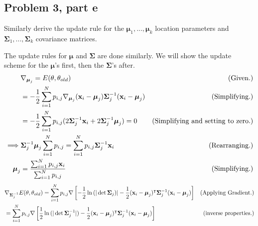 \subsection{Problem 3, part e}
Similarly derive the update rule for the $\boldsymbol{\mu}_1, ..., \boldsymbol{\mu}_k$ location parameters and $\boldsymbol{\Sigma}_1, ..., \boldsymbol{\Sigma}_k$ covariance matrices. 
\vspace{-2mm}\partbreak\vspace{-2mm}
\begin{solution}

    The update rules for $\boldsymbol{\mu}$ and $\boldsymbol{\Sigma}$ are done similarly. We will show the update scheme for the $\boldsymbol{\mu}$'s first, then the $\boldsymbol{\Sigma}$'s after. 
    \tightalignbreak\vspace{-2mm}
    \begin{align*}
        &\nabla_{\boldsymbol{\mu}_j} = E(\theta, \theta_{old}) &\text{(Given.)}\\
        &= -\frac{1}{2}\sum_{i = 1}^N p_{i, j} \nabla_{\boldsymbol{\mu}_j}(\textbf{x}_i - \boldsymbol{\mu}_j) \boldsymbol{\Sigma}^{-1}_j (\textbf{x}_i - \boldsymbol{\mu}_j) &\text{(Simplifying.)}\\
        &= -\frac{1}{2}\sum_{i = 1}^N p_{i, j} (2\boldsymbol{\Sigma}^{-1}_j \textbf{x}_i + 2\boldsymbol{\Sigma}^{-1}_j \boldsymbol{\mu}_j) = 0 &\text{(Simplifying and setting to zero.)}\\
        \implies & \boldsymbol{\Sigma}^{-1}_j\boldsymbol{\mu}_j\sum_{i = 1}^Np_{i, j} = \sum_{i = 1}^N p_{i, j}\boldsymbol{\Sigma}^{-1}_j \textbf{x}_i &\text{(Rearranging.)}\\
        \boldsymbol{\mu}_j &= \frac{\sum_{i = 1}^N{p_{i, j}\textbf{x}_i}}{\sum_{i = 1}^N{p_{i, j}}} &\text{(Simplifying.)}
    \end{align*}
    \vspace{-12mm}\alignbreak\vspace{-6mm}
    \begin{align*}
        &\grad_{\boldsymbol{\Sigma}\inv_j} E(\theta, \theta_{old}) = \sum_{i = 1}^N p_{i, j} \grad \left[ -\frac{1}{2} \ln{(|\det \boldsymbol{\Sigma}_j)|}  - \frac{1}{2}(\textbf{x}_i - \boldsymbol{\mu}_j)\T \boldsymbol{\Sigma}\inv_j (\textbf{x}_i - \boldsymbol{\mu}_j)\right] &\text{(Applying Gradient.)}\\
        &= \sum_{i = 1}^N p_{i, j} \grad \left[ \frac{1}{2} \ln{(|\det \boldsymbol{\Sigma}\inv_j|)}  - \frac{1}{2}(\textbf{x}_i - \boldsymbol{\mu}_j)\T \boldsymbol{\Sigma}\inv_j (\textbf{x}_i - \boldsymbol{\mu}_j)\right] &\text{(inverse properties.)}\\

\end{align*}
\end{solution}
